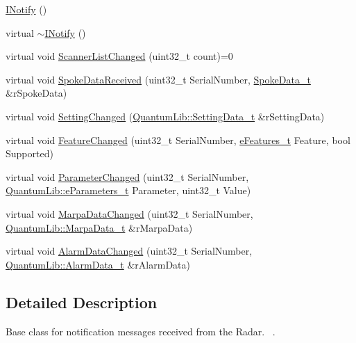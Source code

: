 \begin{DoxyCompactItemize}
\item 
\mbox{\hyperlink{class_quantum_lib_1_1_i_notify_a8605cda14fb993a16484d428d4361d00}{I\+Notify}} ()
\item 
virtual \mbox{\hyperlink{class_quantum_lib_1_1_i_notify_a9f00b489e5d31a80e63801166bb13e3e}{$\sim$\+I\+Notify}} ()
\item 
virtual void \mbox{\hyperlink{class_quantum_lib_1_1_i_notify_a5b91aeecff71a2232cddf73199cc0213}{Scanner\+List\+Changed}} (uint32\+\_\+t count)=0
\item 
virtual void \mbox{\hyperlink{class_quantum_lib_1_1_i_notify_a5e4b6945d8009cc8f820353237ef489c}{Spoke\+Data\+Received}} (uint32\+\_\+t Serial\+Number, \mbox{\hyperlink{struct_quantum_lib_1_1_spoke_data__t}{Spoke\+Data\+\_\+t}} \&r\+Spoke\+Data)
\item 
virtual void \mbox{\hyperlink{class_quantum_lib_1_1_i_notify_aa7224861ce088af10d5b471d9550bb21}{Setting\+Changed}} (\mbox{\hyperlink{struct_quantum_lib_1_1_setting_data__t}{Quantum\+Lib\+::\+Setting\+Data\+\_\+t}} \&r\+Setting\+Data)
\item 
virtual void \mbox{\hyperlink{class_quantum_lib_1_1_i_notify_ae92378ad5ad3bdee002306a0723a5565}{Feature\+Changed}} (uint32\+\_\+t Serial\+Number, \mbox{\hyperlink{namespace_quantum_lib_a10da739314e0c51341b3d5d059ead777}{e\+Features\+\_\+t}} Feature, bool Supported)
\item 
virtual void \mbox{\hyperlink{class_quantum_lib_1_1_i_notify_a884178a07e8f2143eb1511bee99a1e51}{Parameter\+Changed}} (uint32\+\_\+t Serial\+Number, \mbox{\hyperlink{namespace_quantum_lib_a7fefffa3a6029981b52ea03463b6255c}{Quantum\+Lib\+::e\+Parameters\+\_\+t}} Parameter, uint32\+\_\+t Value)
\item 
virtual void \mbox{\hyperlink{class_quantum_lib_1_1_i_notify_a33dec2e67057bb72fd0a00dc4e001fb7}{Marpa\+Data\+Changed}} (uint32\+\_\+t Serial\+Number, \mbox{\hyperlink{struct_quantum_lib_1_1_marpa_data__t}{Quantum\+Lib\+::\+Marpa\+Data\+\_\+t}} \&r\+Marpa\+Data)
\item 
virtual void \mbox{\hyperlink{class_quantum_lib_1_1_i_notify_ab336885c5d718ed5bbe1eaab959bf880}{Alarm\+Data\+Changed}} (uint32\+\_\+t Serial\+Number, \mbox{\hyperlink{struct_quantum_lib_1_1_alarm_data__t}{Quantum\+Lib\+::\+Alarm\+Data\+\_\+t}} \&r\+Alarm\+Data)
\end{DoxyCompactItemize}


\subsection{Detailed Description}
Base class for notification messages received from the Radar.~\newline
. 

